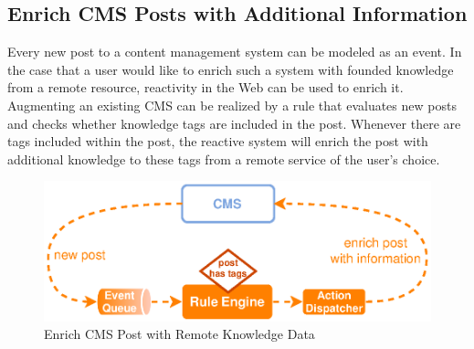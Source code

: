 \subsection{Enrich \textrm{CMS} Posts with Additional Information}
Every new post to a content management system can be modeled as an event.
In the case that a user would like to enrich such a system with founded knowledge from a remote resource, reactivity in the Web can be used to enrich it.
Augmenting an existing \textrm{CMS} can be realized by a rule that evaluates new posts and checks whether knowledge tags are included in the post.
Whenever there are tags included within the post, the reactive system will enrich the post with additional knowledge to these tags from a remote service of the user's choice.
\begin{figure}[!ht]
  \centering
  \includegraphics{figures/ProBinderAnnotations}
  \caption{Enrich CMS Post with Remote Knowledge Data}
  \label{fig:ProBinderAnnotations}
\end{figure}


